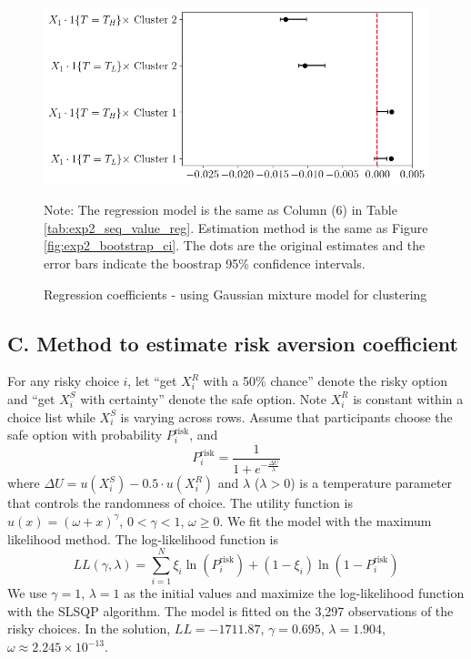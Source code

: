\begin{figure} 
\centering
\includegraphics[width=0.85\linewidth]{figures/exp2_bootstrap_ci_label_gmm_fe.png}
\caption{Regression coefficients - using Gaussian mixture model for clustering}
\vspace*{4pt}
\centering

\begin{minipage}{1.0\textwidth}
{\par\footnotesize Note: The regression model is the same as Column (6) in Table \ref{tab:exp2_seq_value_reg}. Estimation method is the same as Figure \ref{fig:exp2_bootstrap_ci}. The dots are the original estimates and the error bars indicate the boostrap 95\% confidence intervals. }
\end{minipage}
\label{fig:exp2_bootstrap_ci_gmm}
\end{figure}

\newpage

\hypertarget{c.-method-to-estimate-risk-aversion-coefficient}{%
\subsection*{C. Method to estimate risk aversion
coefficient}\label{c.-method-to-estimate-risk-aversion-coefficient}}

For any risky choice \(i\), let ``get \(X_i^R\) with a 50\% chance''
denote the risky option and ``get \(X_i^S\) with certainty'' denote the
safe option. Note \(X_i^R\) is constant within a choice list while
\(X_i^S\) is varying across rows. Assume that participants choose the
safe option with probability \(P_i^{\text{risk}}\), and\[
P_i^{\text{risk}} = \frac{1}{1+e^{-\frac{\Delta U}{\lambda}}}
\]where \(\Delta U = u(X_i^S) - 0.5\cdot u(X_i^R)\) and \(\lambda\)
(\(\lambda >0\)) is a temperature parameter that controls the randomness
of choice. The utility function is \(u(x)=(\omega+x)^\gamma\),
\(0<\gamma<1\), \(\omega\geq 0\). We fit the model with the maximum
likelihood method. The log-likelihood function is\[
LL(\gamma,\lambda) = \sum_{i=1}^N \xi_i\ln(P_i^{\text{risk}})+(1-\xi_i)\ln(1-P_i^{\text{risk}}) 
\]We use \(\gamma=1\), \(\lambda =1\) as the initial values and maximize
the log-likelihood function with the SLSQP algorithm. The model is
fitted on the 3,297 observations of the risky choices. In the solution,
\(LL=-1711.87\), \(\gamma=0.695\), \(\lambda=1.904\),
\(\omega\approx 2.245\times10^{-13}\).
